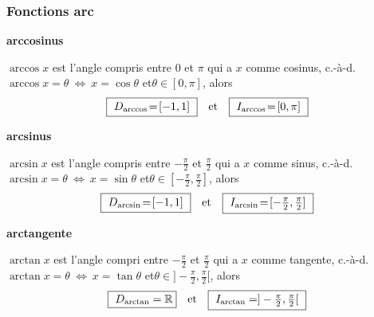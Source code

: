 


\begin{frame}[plain]
\frametitle{\bf Fonctions arc}
\medskip 

\begin{itemize}
\bitem
{\bf arccosinus}\ \quad 
\vspace*{1mm}

$\arccos x$ est l'angle compris entre $0$ et $\pi$ qui a $x$ comme cosinus, 
c.-\`a-d.\quad $\arccos x = \theta \ \Leftrightarrow\ x=\cos \theta$\quad 
et\quad $\theta\in [0,\pi]$, alors
$$
\mbox{
\framebox{\ $D_{\arccos}\!=\![-1,1]$\ }\quad et\quad 
\framebox{\ $I_{\arccos}\!=\![0,\pi]$\ }
}
$$
\vspace*{1mm}

\pause
\bitem
{\bf arcsinus}\ \quad 
\vspace*{1mm}

$\arcsin x$ est l'angle compris entre $-\frac{\pi}{2}$ et $\frac{\pi}{2}$ 
qui a $x$ comme sinus, c.-\`a-d.\quad 
$\arcsin x = \theta \ \Leftrightarrow\ x=\sin \theta$\quad 
et\quad $\theta\in [-\frac{\pi}{2},\frac{\pi}{2}]$, alors\quad 
$$
\mbox{
\framebox{\ $D_{\arcsin}\!=\![-1,1]$\ }\quad et\quad 
\framebox{\ $I_{\arcsin}\!=\![-\frac{\pi}{2},\frac{\pi}{2}]$\ }
}
$$
\vspace*{1mm}

\pause
\bitem
{\bf arctangente}\ \quad 
\vspace*{1mm}

$\arctan x$ est l'angle compri entre $-\frac{\pi}{2}$ et $\frac{\pi}{2}$ 
qui a $x$ comme tangente, c.-\`a-d.\quad 
$\arctan x = \theta \ \Leftrightarrow\ x=\tan \theta$\quad 
et\quad $\theta\in ]-\frac{\pi}{2},\frac{\pi}{2}[$, alors\quad 
$$
\mbox{
\framebox{\ $D_{\arctan}=\R$}\quad et\quad 
\framebox{\ $I_{\arctan}=]-\frac{\pi}{2},\frac{\pi}{2}[$\ }
}
$$
\end{itemize}

\end{frame}


